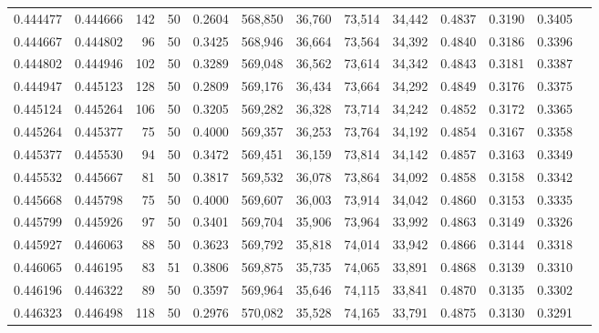\begin{tabular}{rrrrrrrrrrrrr}
0.444477 & 0.444666 &   142 &  50 &                                     0.2604 & 568,850 &  36,760 &  73,514 &  34,442 & 0.4837 & 0.3190 & 0.3405 \\
0.444667 & 0.444802 &    96 &  50 &                                     0.3425 & 568,946 &  36,664 &  73,564 &  34,392 & 0.4840 & 0.3186 & 0.3396 \\
0.444802 & 0.444946 &   102 &  50 &                                     0.3289 & 569,048 &  36,562 &  73,614 &  34,342 & 0.4843 & 0.3181 & 0.3387 \\
0.444947 & 0.445123 &   128 &  50 &                                     0.2809 & 569,176 &  36,434 &  73,664 &  34,292 & 0.4849 & 0.3176 & 0.3375 \\
0.445124 & 0.445264 &   106 &  50 &                                     0.3205 & 569,282 &  36,328 &  73,714 &  34,242 & 0.4852 & 0.3172 & 0.3365 \\
0.445264 & 0.445377 &    75 &  50 &                                     0.4000 & 569,357 &  36,253 &  73,764 &  34,192 & 0.4854 & 0.3167 & 0.3358 \\
0.445377 & 0.445530 &    94 &  50 &                                     0.3472 & 569,451 &  36,159 &  73,814 &  34,142 & 0.4857 & 0.3163 & 0.3349 \\
0.445532 & 0.445667 &    81 &  50 &                                     0.3817 & 569,532 &  36,078 &  73,864 &  34,092 & 0.4858 & 0.3158 & 0.3342 \\
0.445668 & 0.445798 &    75 &  50 &                                     0.4000 & 569,607 &  36,003 &  73,914 &  34,042 & 0.4860 & 0.3153 & 0.3335 \\
0.445799 & 0.445926 &    97 &  50 &                                     0.3401 & 569,704 &  35,906 &  73,964 &  33,992 & 0.4863 & 0.3149 & 0.3326 \\
0.445927 & 0.446063 &    88 &  50 &                                     0.3623 & 569,792 &  35,818 &  74,014 &  33,942 & 0.4866 & 0.3144 & 0.3318 \\
0.446065 & 0.446195 &    83 &  51 &                                     0.3806 & 569,875 &  35,735 &  74,065 &  33,891 & 0.4868 & 0.3139 & 0.3310 \\
0.446196 & 0.446322 &    89 &  50 &                                     0.3597 & 569,964 &  35,646 &  74,115 &  33,841 & 0.4870 & 0.3135 & 0.3302 \\
0.446323 & 0.446498 &   118 &  50 &                                     0.2976 & 570,082 &  35,528 &  74,165 &  33,791 & 0.4875 & 0.3130 & 0.3291 \\

\end{tabular}
